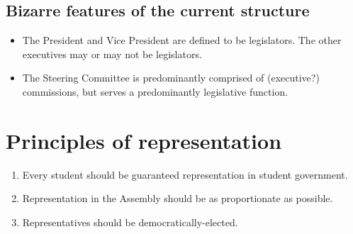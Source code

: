 \documentclass[12pt,letterpaper]{article}
\begin{document}
\subsection*{Bizarre features of the current structure}
\begin{itemize}
	\item The President and Vice President are defined to be legislators.  The other executives may or may not be legislators.
	\item The Steering Committee is predominantly comprised of (executive?) commissions, but serves a predominantly legislative function.
\end{itemize}

\section*{Principles of representation}

\begin{enumerate}
	\item Every student should be guaranteed representation in student government.
	\item Representation in the Assembly should be as proportionate as possible.
	\item Representatives should be democratically-elected.
\end{enumerate}
\end{document}
